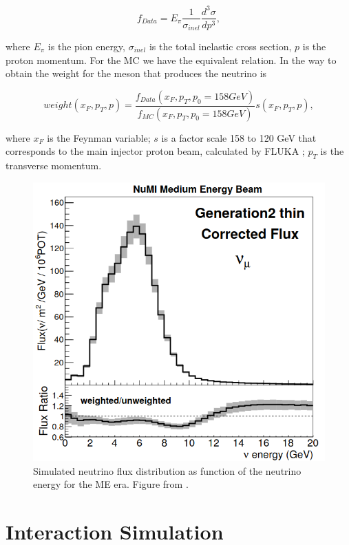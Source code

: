 \begin{equation}
    f_{Data}=E_\pi\frac{1}{\sigma_{inel}}\frac{d^3\sigma}{dp^3},
\end{equation}

where $E_\pi$ is the pion energy, $\sigma_{inel}$ is the total inelastic cross section, $p$ is the proton momentum. For the MC we have the equivalent relation. In the way to obtain the weight for the meson that produces the neutrino is 

\begin{equation}
    weight(x_F,p_T,p) = \frac{f_{Data}(x_F,p_T,p_0=158 GeV)}{f_{MC}(x_F,p_T,p_0=158 GeV)}s(x_F,p_T,p),
\end{equation}

where $x_F$ is the Feynman variable; $s$ is a factor scale 158 to 120 GeV that corresponds to the main injector proton beam, calculated by FLUKA \cite{Fluka}; $p_T$ is the transverse momentum. 

 
\begin{figure}
    \centering
    \includegraphics[scale=0.3]{Figures/Chapter3/FluxDistribution.png}
    \caption{Simulated neutrino flux distribution as function of the neutrino energy for the ME era. Figure from \cite{LeoThesis}.}
    \label{fig:Simulation:Beam:FluxDistribution}
\end{figure}

\section{Interaction Simulation}
\label{Cap:Simulation:InteractionSimulation}

